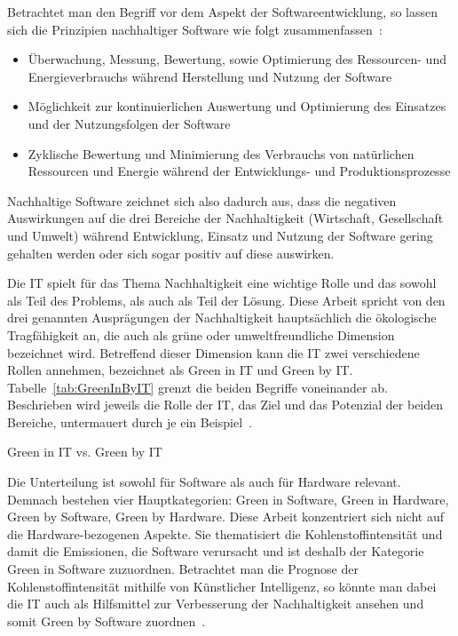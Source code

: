 Betrachtet man den Begriff vor dem Aspekt der Softwareentwicklung, so lassen sich die Prinzipien nachhaltiger Software wie folgt zusammenfassen~\cite{Calero.2015}:
\begin{itemize}
 \item Überwachung, Messung, Bewertung, sowie Optimierung des Ressourcen- und Energieverbrauchs während Herstellung und Nutzung der Software
\item Möglichkeit zur kontinuierlichen Auswertung und Optimierung des Einsatzes und der Nutzungsfolgen der Software
\item Zyklische Bewertung und Minimierung des Verbrauchs von natürlichen Ressourcen und Energie während der Entwicklungs- und Produktionsprozesse
\end{itemize}
Nachhaltige Software zeichnet sich also dadurch aus, dass die negativen Auswirkungen auf die drei Bereiche der Nachhaltigkeit (Wirtschaft, Gesellschaft und Umwelt) während Entwicklung, Einsatz und Nutzung der Software gering gehalten werden oder sich sogar positiv auf diese auswirken.

Die \ac{IT} spielt für das Thema Nachhaltigkeit eine wichtige Rolle und das sowohl als Teil des Problems, als auch als Teil der Lösung.
Diese Arbeit spricht von den drei genannten Ausprägungen der Nachhaltigkeit hauptsächlich die ökologische Tragfähigkeit an, die auch als \glqq grüne\grqq{} oder \glqq umweltfreundliche\grqq{} Dimension bezeichnet wird.
Betreffend dieser Dimension kann die \ac{IT} zwei verschiedene Rollen annehmen, bezeichnet als Green in \ac{IT} und Green by \ac{IT}\@.
Tabelle~\ref{tab:GreenInByIT} grenzt die beiden Begriffe voneinander ab.
Beschrieben wird jeweils die Rolle der \ac{IT}, das Ziel und das Potenzial der beiden Bereiche, untermauert durch je ein Beispiel~\cite{Calero.2015}.

\begin{table}[t]
 \centering\small
 \caption{Green in IT vs. Green by IT}
 \label{tab:GreenInByIT}
 
\end{table}

Die Unterteilung ist sowohl für Software als auch für Hardware relevant.
Demnach bestehen vier Hauptkategorien:
Green in Software, Green in Hardware, Green by Software, Green by Hardware.
Diese Arbeit konzentriert sich nicht auf die Hardware-bezogenen Aspekte.
Sie thematisiert die Kohlenstoffintensität und damit die Emissionen, die Software verursacht und ist deshalb der Kategorie Green in Software zuzuordnen.
Betrachtet man die Prognose der Kohlenstoffintensität mithilfe von Künstlicher Intelligenz, so könnte man dabei die \ac{IT} auch als Hilfsmittel zur Verbesserung der Nachhaltigkeit ansehen und somit Green by Software zuordnen~\cite{Calero.2015}.

